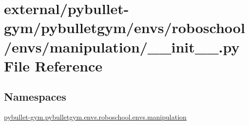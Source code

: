 \hypertarget{external_2pybullet-gym_2pybulletgym_2envs_2roboschool_2envs_2manipulation_2____init_____8py}{}\section{external/pybullet-\/gym/pybulletgym/envs/roboschool/envs/manipulation/\+\_\+\+\_\+init\+\_\+\+\_\+.py File Reference}
\label{external_2pybullet-gym_2pybulletgym_2envs_2roboschool_2envs_2manipulation_2____init_____8py}
\subsection*{Namespaces}
\begin{DoxyCompactItemize}
\item 
 \hyperlink{namespacepybullet-gym_1_1pybulletgym_1_1envs_1_1roboschool_1_1envs_1_1manipulation}{pybullet-\/gym.\+pybulletgym.\+envs.\+roboschool.\+envs.\+manipulation}
\end{DoxyCompactItemize}
